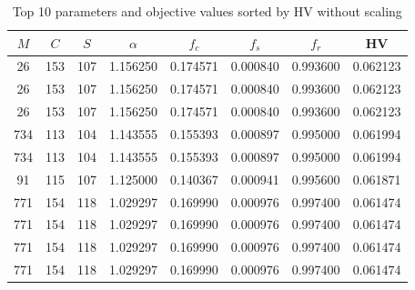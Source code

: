 \begin{table}[ht]
    \centering
    \caption{Top 10 parameters and objective values sorted by HV without scaling}
    \label{tbl:compare-obj-non-scaling}
    \begin{tabular}{cccccccc}
        \toprule
        $M$ & $C$ & $S$ & $\alpha$ & $f_c$ & $f_s$ & $f_r$ & HV \\
        \midrule
        26 & 153 & 107 & 1.156250 & 0.174571 & 0.000840 & 0.993600 & 0.062123 \\
        26 & 153 & 107 & 1.156250 & 0.174571 & 0.000840 & 0.993600 & 0.062123 \\
        26 & 153 & 107 & 1.156250 & 0.174571 & 0.000840 & 0.993600 & 0.062123 \\
        734 & 113 & 104 & 1.143555 & 0.155393 & 0.000897 & 0.995000 & 0.061994 \\
        734 & 113 & 104 & 1.143555 & 0.155393 & 0.000897 & 0.995000 & 0.061994 \\
        91 & 115 & 107 & 1.125000 & 0.140367 & 0.000941 & 0.995600 & 0.061871 \\
        771 & 154 & 118 & 1.029297 & 0.169990 & 0.000976 & 0.997400 & 0.061474 \\
        771 & 154 & 118 & 1.029297 & 0.169990 & 0.000976 & 0.997400 & 0.061474 \\
        771 & 154 & 118 & 1.029297 & 0.169990 & 0.000976 & 0.997400 & 0.061474 \\
        771 & 154 & 118 & 1.029297 & 0.169990 & 0.000976 & 0.997400 & 0.061474 \\
        \bottomrule
    \end{tabular}
\end{table}

